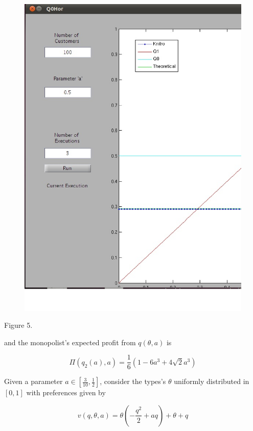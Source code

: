 \begin{itemize}
\begin{center}
\begin{figure}[h!]
\includegraphics[scale=0.2]{knitroplus.eps} 
\end{figure}
Figure 5.
\end{center}




and the monopolist's expected profit from $q(\theta,a)$ is 

$$\Pi(q_{2}(a),a)=\dfrac{1}{6} (1 - 6 a^{3} + 4 \sqrt{2} a^{3})$$


 \vspace{1cm}

Given a parameter $a\in[\frac{3}{10},\frac{1}{2}]$, consider the types's $\theta$ uniformly distributed in $[0,1]$ with preferences given by

 $$v(q,\theta,a)= \theta(-\dfrac{q^{2}}{2} + aq) + \theta + q$$


\end{itemize}
